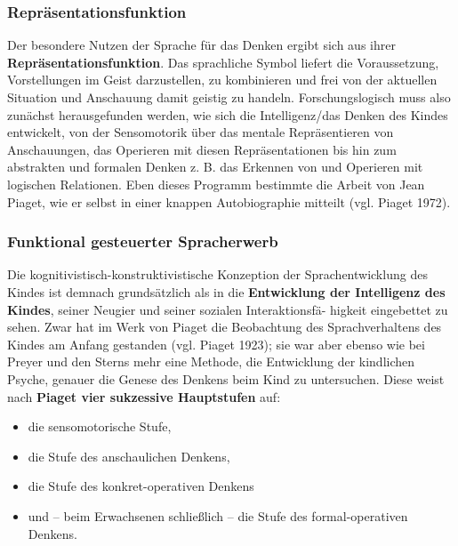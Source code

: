 \documentclass[
  letterpaper,
]{scrbook}
\begin{document}
\hypertarget{repruxe4sentationsfunktion}{%
\subsubsection{Repräsentationsfunktion}\label{repruxe4sentationsfunktion}}

Der besondere Nutzen der Sprache für das Denken ergibt sich aus ihrer
\textbf{Repräsentationsfunktion}. Das sprachliche Symbol liefert die
Voraussetzung, Vorstellungen im Geist darzustellen, zu kombinieren und
frei von der aktuellen Situation und Anschauung damit geistig zu
handeln. Forschungslogisch muss also zunächst herausgefunden werden, wie
sich die Intelligenz/das Denken des Kindes entwickelt, von der
Sensomotorik über das mentale Repräsentieren von Anschauungen, das
Operieren mit diesen Repräsentationen bis hin zum abstrakten und
formalen Denken z. B. das Erkennen von und Operieren mit logischen
Relationen. Eben dieses Programm bestimmte die Arbeit von Jean Piaget,
wie er selbst in einer knappen Autobiographie mitteilt (vgl. Piaget
1972).

\hypertarget{funktional-gesteuerter-spracherwerb}{%
\subsubsection{Funktional gesteuerter
Spracherwerb}\label{funktional-gesteuerter-spracherwerb}}

Die kognitivistisch-konstruktivistische Konzeption der Sprachentwicklung
des Kindes ist demnach grundsätzlich als in die \textbf{Entwicklung der
Intelligenz des Kindes}, seiner Neugier und seiner sozialen
Interaktionsfä- higkeit eingebettet zu sehen. Zwar hat im Werk von
Piaget die Beobachtung des Sprachverhaltens des Kindes am Anfang
gestanden (vgl. Piaget 1923); sie war aber ebenso wie bei Preyer und den
Sterns mehr eine Methode, die Entwicklung der kindlichen Psyche, genauer
die Genese des Denkens beim Kind zu untersuchen. Diese weist nach
\textbf{Piaget vier sukzessive Hauptstufen} auf:

\begin{itemize}
\item
  die sensomotorische Stufe,
\item
  die Stufe des anschaulichen Denkens,
\item
  die Stufe des konkret-operativen Denkens
\item
  und -- beim Erwachsenen schließlich -- die Stufe des formal-operativen
  Denkens.
\end{itemize}
\end{document}
